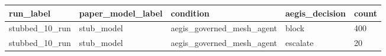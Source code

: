 \begin{tabular}{lllll}
 \hline
run\_label & paper\_model\_label & condition & aegis\_decision & count \\
 \hline
stubbed\_10\_run & stub\_model & aegis\_governed\_mesh\_agent & block & 400 \\
stubbed\_10\_run & stub\_model & aegis\_governed\_mesh\_agent & escalate & 20 \\
 \hline
\end{tabular}
